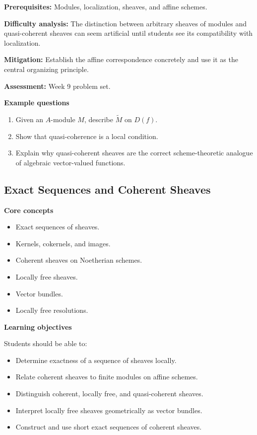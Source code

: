 \documentclass[11pt]{article}
\begin{document}
\textbf{Prerequisites:} Modules, localization, sheaves, and affine schemes.

\textbf{Difficulty analysis:} The distinction between arbitrary sheaves of modules and quasi-coherent sheaves can seem artificial until students see its compatibility with localization.

\textbf{Mitigation:} Establish the affine correspondence concretely and use it as the central organizing principle.

\textbf{Assessment:} Week 9 problem set.

\textbf{Example questions}
\begin{enumerate}
    \item Given an $A$-module $M$, describe $\widetilde{M}$ on $D(f)$.
    \item Show that quasi-coherence is a local condition.
    \item Explain why quasi-coherent sheaves are the correct scheme-theoretic analogue of algebraic vector-valued functions.
\end{enumerate}

\subsection{Exact Sequences and Coherent Sheaves}

\textbf{Core concepts}
\begin{itemize}
    \item Exact sequences of sheaves.
    \item Kernels, cokernels, and images.
    \item Coherent sheaves on Noetherian schemes.
    \item Locally free sheaves.
    \item Vector bundles.
    \item Locally free resolutions.
\end{itemize}

\textbf{Learning objectives}

Students should be able to:
\begin{itemize}
    \item Determine exactness of a sequence of sheaves locally.
    \item Relate coherent sheaves to finite modules on affine schemes.
    \item Distinguish coherent, locally free, and quasi-coherent sheaves.
    \item Interpret locally free sheaves geometrically as vector bundles.
    \item Construct and use short exact sequences of coherent sheaves.
\end{itemize}
\end{document}
